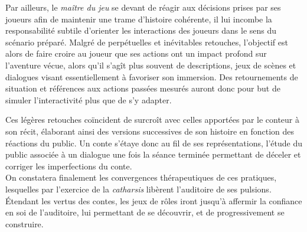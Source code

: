 Par ailleurs, le \textit{maître du jeu} se devant de réagir aux décisions prises par ses joueurs afin de maintenir une trame d'histoire cohérente, il lui incombe la responsabilité subtile d'orienter les interactions des joueurs dans le sens du scénario préparé. Malgré de perpétuelles et inévitables retouches, l'objectif est alors de faire croire au joueur que ses actions ont un impact profond sur l'aventure vécue, alors qu'il s'agît plus souvent de descriptions, jeux de scènes et dialogues visant essentiellement à favoriser son immersion. Des retournements de situation et références aux actions passées mesurés auront donc pour but de simuler l'interactivité plus que de s'y adapter.

Ces légères retouches coïncident de surcroît avec celles apportées par le conteur à son récit, élaborant ainsi des versions successives de son histoire en fonction des réactions du public. Un conte s'étaye donc au fil de ses représentations, l'étude du public associée à un dialogue une fois la séance terminée permettant de déceler et corriger les imperfections du conte.\\


On constatera finalement les convergences thérapeutiques de ces pratiques, lesquelles par l'exercice de la \textit{catharsis} libèrent l'auditoire de ses pulsions. Étendant les vertus des contes, les jeux de rôles iront jusqu'à affermir la confiance en soi de l'auditoire, lui permettant de se découvrir, et de progressivement se construire.

\clearpage
